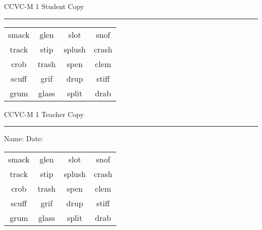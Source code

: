 \documentclass{memoir}
\begin{document}

\footnotesize \noindent
CCVC-M 1 \hfill Student Copy
\smallskip
\hrule

\Large

\setlength{\tabcolsep}{14pt}
\def\arraystretch{3}

{\selectfont


\begin{vplace}[0.5]
\begin{center}
\begin{tabular}{cccc}
smack & glen & slot & snof \\
track       & stip & splush & crash \\
crob & trash & spen & clem \\
scuff & grif      & drup & stiff \\
grum       & glass & split & drab             \\
\end{tabular}
\end{center}
\end{vplace}

}

\newpage

\footnotesize \noindent
CCVC-M 1 \hfill Teacher Copy
\smallskip
\hrule

\small

\vfill

\noindent
Name: \underline{\hspace{1.75in}} \hfill Date: \underline{\hspace{1in}}

\Large

{\selectfont


\begin{vplace}[0.5]
\begin{center}
\begin{tabular}{cccc}
smack & glen & slot & snof \\
track       & stip & splush & crash \\
crob & trash & spen & clem \\
scuff & grif      & drup & stiff \\
grum       & glass & split & drab             \\
\end{tabular}
\end{center}
\end{vplace}



}
\end{document}
